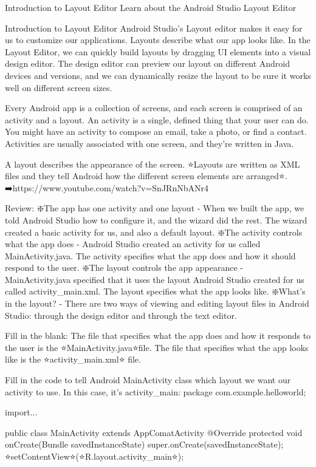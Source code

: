 Introduction to Layout Editor
        Learn about the Android Studio Layout Editor

Introduction to Layout Editor
        Android Studio’s Layout editor makes it easy for us to customize our applications. Layouts describe what our app looks like. In the Layout Editor, we can quickly build layouts by dragging UI elements into a visual design editor. The design editor can preview our layout on different Android devices and versions, and we can dynamically resize the layout to be sure it works well on different screen sizes.

        Every Android app is a collection of screens, and each screen is comprised of an activity and a layout. An activity is a single, defined thing that your user can do. You might have an activity to compose an email, take a photo, or find a contact. Activities are usually associated with one screen, and they’re written in Java.

        A layout describes the appearance of the screen. ⭐Layouts are written as XML files and they tell Android how the different screen elements are arranged⭐.
            ➡️https://www.youtube.com/watch?v=SnJRnNbANr4

    Review:
        ❇️The app has one activity and one layout - When we built the app, we told Android Studio how to configure it, and the wizard did the rest. The wizard created a basic activity for us, and also a default layout.
        ❇️The activity controls what the app does - Android Studio created an activity for us called MainActivity.java. The activity specifies what the app does and how it should respond to the user.
        ❇️The layout controls the app appearance - MainActivity.java specified that it uses the layout Android Studio created for us called activity_main.xml. The layout specifies what the app looks like.
        ❇️What’s in the layout? - There are two ways of viewing and editing layout files in Android Studio: through the design editor and through the text editor.

    Fill in the blank:
        The file that specifies what the app does and how it responds to the user is the  ⭐MainActivity.java⭐file. The file that specifies what the app looks like is the ⭐activity_main.xml⭐ file.
        
    Fill in the code to tell Android MainActivity class which layout we want our activity to use. In this case, it’s activity_main:
        package com.example.helloworld;
        
        import...
        
        public class MainActivity extends AppComatActivity {
            @Override
            protected void onCreate(Bundle savedInstanceState) {
                super.onCreate(savedInstanceState);
                ⭐setContentView⭐(⭐R.layout.activity_main⭐);
            }
        }